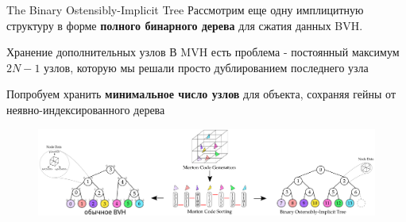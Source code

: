 \begin{frame}{The Binary Ostensibly-Implicit Tree}
    Рассмотрим еще одну имплицитную структуру в форме \textbf{полного бинарного дерева} для сжатия данных BVH.

    \begin{block}{Хранение дополнительных узлов}
        В MVH есть проблема - постоянный максимум $2N - 1$ узлов, которую мы решали просто дублированием последнего узла
    \end{block}

    \begin{block}{}
        Попробуем хранить \textbf{минимальное число узлов} для объекта, сохраняя гейны от неявно-индексированного дерева
    \end{block}

    \begin{figure}
    \begin{center}
        \includegraphics[width=\textwidth]{res/boi.png}
    \end{center}
    \end{figure}

\end{frame}

